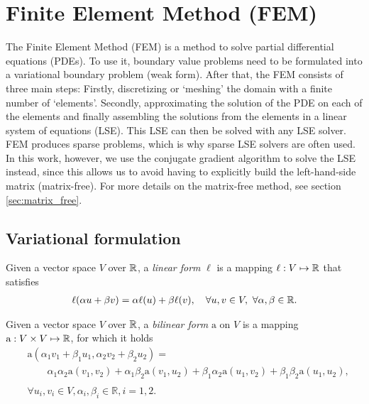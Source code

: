 

\section{Finite Element Method (FEM)}


\label{sec:fem_intro}

The Finite Element Method (FEM) is a method to solve partial differential equations (PDEs).
To use it, boundary value problems
need to be formulated into a variational boundary problem (weak form).
After that, the FEM consists of three main steps:
Firstly, discretizing or `meshing' the domain with a finite number of `elements'.
Secondly, approximating the solution of the PDE on each of the elements and finally
assembling the solutions from the elements in a linear system of equations (LSE).
This LSE can then be solved with any LSE solver.
FEM produces sparse problems,
which is why sparse LSE solvers are often used.
In this work, however, we use the conjugate gradient algorithm to solve the LSE instead,
since this allows us to avoid having to explicitly build the left-hand-side matrix (matrix-free).
For more details on the matrix-free method, see section \ref{sec:matrix_free}.

\subsection{Variational formulation}

\begin{definition}
    \label{def:linear_form}
    Given a vector space $V$ over $\mathbb{R}$, a \emph{linear form} $\ell$ is a mapping
    $\ell: V \mapsto \mathbb{R}$ that satisfies
    \cite[Def.~0.3.1.4]{hiptmair_numerical_2023}
    \begin{align}
        \ell(\alpha u + \beta v) = \alpha \ell(u) + \beta \ell(v), \quad
        \forall u,v \in V, \ \forall \alpha, \beta \in \mathbb{R}.
    \end{align}
\end{definition}

\begin{definition}
    \label{def:bilinear_form}
    Given a vector space $V$ over $\mathbb{R}$, a \emph{bilinear form} $\mathrm{a}$ on $V$
    is a mapping $\mathrm{a}: V \times V \mapsto \mathbb{R}$, for which it holds
    \cite[Def.~0.3.1.4]{hiptmair_numerical_2023}
    \begin{align}
         & \mathrm{a}\left(\alpha_1 v_1+\beta_1 u_1, \alpha_2 v_2+\beta_2 u_2\right)= \nonumber \\
         & \qquad \alpha_1 \alpha_2 \mathrm{a}\left(v_1, v_2\right)
        +\alpha_1 \beta_2 \mathrm{a}\left(v_1, u_2\right)
        +\beta_1 \alpha_2 \mathrm{a}\left(u_1, v_2\right)
        +\beta_1 \beta_2 \mathrm{a}\left(u_1, u_2\right),                                       \\
        \nonumber                                                                               \\
         & \forall u_i, v_i \in V, \alpha_i, \beta_i \in \mathbb{R}, i=1,2. \nonumber
    \end{align}
\end{definition}

